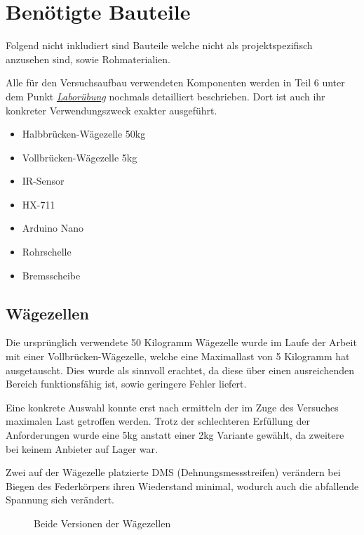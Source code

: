 \section{Benötigte Bauteile}

Folgend nicht inkludiert sind Bauteile welche nicht als projektspezifisch anzusehen sind, sowie Rohmaterialien.

Alle für den Versuchsaufbau verwendeten Komponenten werden in Teil 6 unter dem Punkt \hyperref[labuebung]{\textit{Laborübung}} nochmals detailliert beschrieben.
Dort ist auch ihr konkreter Verwendungszweck exakter ausgeführt.

\begin{itemize}
    \item Halbbrücken-Wägezelle 50kg
    \item Vollbrücken-Wägezelle 5kg
    \item IR-Sensor
    \item HX-711
    \item Arduino Nano
    \item Rohrschelle
    \item Bremsscheibe
\end{itemize}

\subsection{Wägezellen}

Die ursprünglich verwendete 50 Kilogramm Wägezelle wurde im Laufe der Arbeit mit einer Vollbrücken-Wägezelle, welche eine Maximallast von 5 Kilogramm hat ausgetauscht.
Dies wurde als sinnvoll erachtet, da diese über einen ausreichenden Bereich funktionsfähig ist, sowie geringere Fehler liefert.

Eine konkrete Auswahl konnte erst nach ermitteln der im Zuge des Versuches maximalen Last getroffen werden.
Trotz der schlechteren Erfüllung der Anforderungen wurde eine 5kg anstatt einer 2kg Variante gewählt, da zweitere bei keinem Anbieter auf Lager war.

Zwei auf der Wägezelle platzierte DMS (Dehnungsmessstreifen) verändern bei Biegen des Federkörpers ihren Wiederstand minimal, wodurch auch die abfallende Spannung sich verändert.

\begin{figure}[H]
    \centering
    \hfill
    \hfill
    \hfill
    \caption{Beide Versionen der Wägezellen}
\end{figure}

